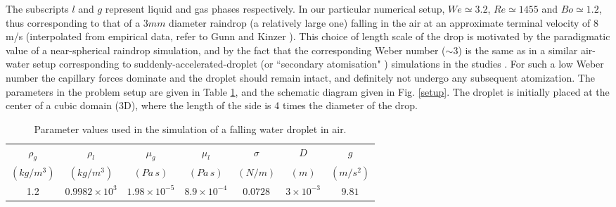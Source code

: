 The subscripts $l$ and $g$ represent liquid and gas phases respectively. 
In our particular numerical setup, $We \simeq 3.2 $, 
$Re \simeq 1455 $ and $Bo \simeq 1.2 $,
thus corresponding to that of a $3mm$ diameter raindrop (a relatively large one) 
falling in the air at an approximate terminal velocity of  
$8$ m/s (interpolated from empirical data, refer to Gunn and Kinzer \cite{gunn1949}). 
This choice of length scale of the drop is motivated by the paradigmatic value
of a near-spherical raindrop simulation, and by the fact that the corresponding Weber
number ($\sim 3$) is the same as in a similar air-water setup corresponding to  
suddenly-accelerated-droplet (or ``secondary atomisation" ) simulations in the studies \cite{xiao2012,xiao2014large}.
For such a low Weber number the capillary forces dominate and the 
droplet should remain intact, and definitely not undergo any subsequent atomization. 
The parameters in the problem setup are given in Table \ref{raindropprop}, 
and the schematic diagram given in Fig. \ref{setup}. 
The droplet is initially placed at the center of a cubic domain (3D), 
where the length of the side is 4 times the diameter of the drop. 

\begin{table}[h!]
\begin{center}
\begin{tabular}{ccccccc}
\hline\hline
$\rho_{g}$ & $\rho_{l}$ & $\mu_{g}$ 
& $\mu_{l}$ & $\sigma$ & $D$ & $g$\\
$\left(kg/m^3\right)$ & $\left(kg/m^3\right)$ & $\left(Pa \, s\right)$ 
& $\left(Pa \,s \right)$ & $\left(N/m\right)$ & $(m)$ & $(m /s^{2})$ \\
\hline
1.2 & $0.9982 \times 10^3$ & $1.98 \times 10^{-5}$ & 
$8.9 \times 10^{-4}$ & $0.0728$ & $3 \times 10^{-3}$ & $9.81$\\
\hline\hline
\end{tabular}
\caption{Parameter values used in the simulation 
	of a falling water droplet in air. \label{raindropprop}}
\end{center}
\end{table}


